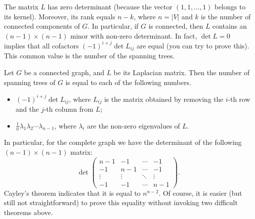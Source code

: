 \begin{page}


The matrix $L$ has zero determinant (because the vector $(1, 1, \ldots, 1)$ belongs to its kernel).
Moreover, its rank equals $n-k$, where $n = |V|$ and $k$ is the number of connected components of $G$.
In particular, if $G$ is connected, then $L$ contains an $(n-1) \times (n-1)$ minor with non-zero determinant.
In fact, $\det L = 0$ implies that all cofactors $(-1)^{i+j} \det L_{ij}$ are equal (you can try to prove this).
This common value is the number of the spanning trees.


\end{page}

\begin{page}

\begin{thm}[Kirchhoff]
Let $G$ be a connected graph, and $L$ be its Laplacian matrix.
Then the number of spanning trees of $G$ is equal to each of the following numbers.
\begin{itemize}
\item $(-1)^{i+j} \det L_{ij}$, where $L_{ij}$ is the matrix obtained by removing the $i$-th row and the $j$-th column from $L$;
\item $\frac{1}{n} \lambda_1 \lambda_2 \cdots \lambda_{n-1}$, where $\lambda_i$ are the non-zero eigenvalues of $L$.
\end{itemize}
\end{thm}

\end{page}

\begin{page}


In particular, for the complete graph we have the determinant of the following $(n-1) \times (n-1)$ matrix:
\[
\det
\begin{pmatrix}
n-1 & -1 & \cdots & -1\\
-1 & n-1 & \cdots & -1\\
\vdots & \vdots & \ddots & \vdots\\
-1 & -1 & \cdots & n-1
\end{pmatrix}.
\]
Cayley's theorem indicates that it is equal to $n^{n-2}$.
Of course, it is easier (but still not straightforward) to prove this equality without invoking two difficult theorems above.




\end{page}

